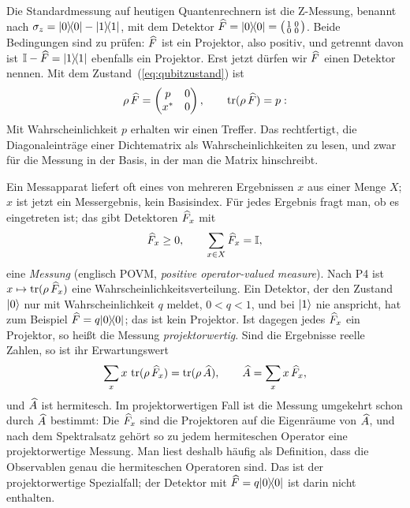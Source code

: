 \begin{beispiel}
Die Standardmessung auf heutigen Quantenrechnern ist die Z-Messung, benannt nach $\sigma_{z} = \lvert 0 \rangle\!\langle 0 \rvert - \lvert 1 \rangle\!\langle 1 \rvert$, mit dem Detektor $\widehat{F} = \lvert 0 \rangle\!\langle 0 \rvert = \bigl(\begin{smallmatrix} 1 & 0 \\ 0 & 0\end{smallmatrix}\bigr)$. Beide Bedingungen sind zu prüfen: $\widehat{F}$ ist ein Projektor, also positiv, und getrennt davon ist $\mathbb{I}-\widehat{F} = \lvert 1 \rangle\!\langle 1 \rvert$ ebenfalls ein Projektor. Erst jetzt dürfen wir $\widehat{F}$ einen Detektor nennen. Mit dem Zustand~(\ref{eq:qubitzustand}) ist
\begin{equation}
	\rho\,\widehat{F} = \begin{pmatrix} p & 0 \\ x^* & 0\end{pmatrix}, \qquad \operatorname{tr}(\rho\,\widehat{F}) = p:
\end{equation}
Mit Wahrscheinlichkeit $p$ erhalten wir einen Treffer. Das rechtfertigt, die Diagonaleinträge einer Dichtematrix als Wahrscheinlichkeiten zu lesen, und zwar für die Messung in der Basis, in der man die Matrix hinschreibt.
\end{beispiel}

Ein Messapparat liefert oft eines von mehreren Ergebnissen $x$ aus einer Menge $X$; $x$ ist jetzt ein Messergebnis, kein Basisindex. Für jedes Ergebnis fragt man, ob es eingetreten ist; das gibt Detektoren $\widehat{F}_x$ mit
\begin{equation}
	\widehat{F}_x \geq 0, \qquad \sum_{x\in X}\widehat{F}_x = \mathbb{I},
\end{equation}
eine \emph{Messung} (englisch POVM, \emph{positive operator-valued measure}). Nach P4 ist $x\mapsto\operatorname{tr}(\rho\,\widehat{F}_x)$ eine Wahrscheinlichkeitsverteilung. Ein Detektor, der den Zustand $\lvert 0 \rangle$ nur mit Wahrscheinlichkeit $q$ meldet, $0 < q < 1$, und bei $\lvert 1 \rangle$ nie anspricht, hat zum Beispiel $\widehat{F} = q\lvert 0 \rangle\!\langle 0 \rvert$; das ist kein Projektor. Ist dagegen jedes $\widehat{F}_x$ ein Projektor, so heißt die Messung \emph{projektorwertig}. Sind die Ergebnisse reelle Zahlen, so ist ihr Erwartungswert
\begin{equation}\label{eq:observableA}
	\sum_x x\,\operatorname{tr}(\rho\,\widehat{F}_x) = \operatorname{tr}(\rho\,\widehat{A}), \qquad \widehat{A} = \sum_x x\,\widehat{F}_x,
\end{equation}
und $\widehat{A}$ ist hermitesch. Im projektorwertigen Fall ist die Messung umgekehrt schon durch $\widehat{A}$ bestimmt: Die $\widehat{F}_x$ sind die Projektoren auf die Eigenräume von $\widehat{A}$, und nach dem Spektralsatz gehört so zu jedem hermiteschen Operator eine projektorwertige Messung. Man liest deshalb häufig als Definition, dass die Observablen genau die hermiteschen Operatoren sind. Das ist der projektorwertige Spezialfall; der Detektor mit $\widehat{F} = q\lvert 0 \rangle\!\langle 0 \rvert$ ist darin nicht enthalten.

